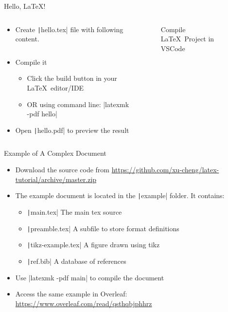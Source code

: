 

\begin{frame}[fragile]{Hello, \LaTeX!}

  \begin{columns}
    \begin{column}{.7\linewidth}
      \begin{itemize}
        \item Create \texttt|hello.tex| file with following content.
              \inputminted{latex}{./minted/hello.tex}
        \item Compile it
              \begin{itemize}
                \item Click the build button in your \LaTeX~editor/IDE
                \item OR using command line: \bashinline|latexmk -pdf hello|
              \end{itemize}
        \item Open \texttt|hello.pdf| to preview the result
      \end{itemize}
    \end{column}

  \begin{column}{.3\linewidth}
      \begin{figure}
        \centering
        \caption{Compile \LaTeX~Project in VSCode}
      \end{figure}
    \end{column}
  \end{columns}
\end{frame}

\begin{frame}[fragile]{Example of A Complex Document}
  \begin{itemize}
    \item Download the source code from \url{https://github.com/xu-cheng/latex-tutorial/archive/master.zip}
    \item The example document is located in the \texttt|example| folder. It contains:
          \begin{itemize}
            \item \texttt|main.tex| The main tex source
            \item \texttt|preamble.tex| A subfile to store format definitions
            \item \texttt|tikz-example.tex| A figure drawn using tikz
            \item \texttt|ref.bib| A database of references
          \end{itemize}
    \item Use \bashinline|latexmk -pdf main| to compile the document
    \item Access the same example in Overleaf: \url{https://www.overleaf.com/read/qsthqbjphhrz}
  \end{itemize}
\end{frame}

